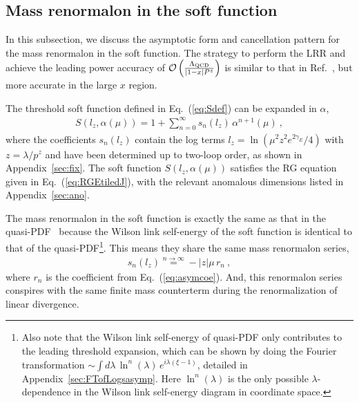 \documentclass[a4paper,11pt]{article}
\begin{document}
\subsection{Mass renormalon in the soft function}\label{sec:MRJ}

In this subsection, we discuss the asymptotic form and cancellation pattern for the mass renormalon in the soft function. The strategy to perform the LRR and achieve the leading power accuracy of $\mathcal{O}\left(\frac{\Lambda_{\rm QCD}}{|1-x| P^z}\right)$ is similar to that in Ref.~\cite{Zhang:2023bxs}, but more accurate in the large $x$ region. 

The threshold soft function defined in Eq.~(\ref{eq:Sdef}) can be expanded in $\alpha$,
\begin{align}
S(l_z,\alpha(\mu)) = 1 + \sum_{n=0}^{\infty} s_{n}(l_z) \, \alpha^{n+1}(\mu) \ ,
\end{align}
where the coefficients $s_{n}\left(l_z\right)$ contain the log terms $l_z =\ln\left( \mu^2 z^2 e^{2 \gamma_E} / 4 \right)$ with $z = \lambda/p^z$ and have been determined up to two-loop order, as shown in Appendix~\ref{sec:fix}. The soft function $S(l_z,\alpha(\mu))$ satisfies the RG equation given in Eq.~(\ref{eq:RGEtiledJ}), with the relevant anomalous dimensions listed in Appendix~\ref{sec:ano}. 

The mass renormalon in the soft function is exactly the same as that in the quasi-PDF~\cite{Braun:2018brg, Liu:2020rqi, Zhang:2023bxs} because the Wilson link self-energy of the soft function is identical to that of the quasi-PDF\footnote{Also note that the Wilson link self-energy of quasi-PDF only contributes to the leading threshold expansion, which can be shown by doing the Fourier transformation $\sim \int d \lambda \, \ln^n\left(\lambda\right) \, e^{i \lambda (\xi-1)}$, detailed in Appendix~\ref{sec:FTofLogsasymp}. Here $\ln^n\left(\lambda\right)$ is the only possible $\lambda$-dependence in the Wilson link self-energy diagram in coordinate space. }. 
This means they share the same mass renormalon series,
\begin{align}\label{eq:Jasymp}
    s_{n}(l_z)  \stackrel{n \rightarrow \infty}{=} - |z|\mu \, r_{n} \ ,
\end{align}
where $r_{n}$ is the coefficient from Eq.~(\ref{eq:asymcoe}). And, this renormalon series conspires with the same finite mass counterterm during the renormalization of linear divergence. 
\end{document}
